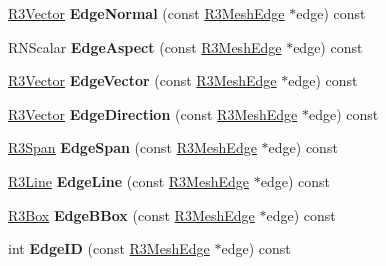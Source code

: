 \begin{DoxyCompactItemize}
\item 
\hyperlink{class_r3_vector}{R3\+Vector} {\bfseries Edge\+Normal} (const \hyperlink{class_r3_mesh_edge}{R3\+Mesh\+Edge} $\ast$edge) const \hypertarget{class_r3_mesh_a323d930cd1a63adc8bb01298bd57156e}{}\label{class_r3_mesh_a323d930cd1a63adc8bb01298bd57156e}

\item 
R\+N\+Scalar {\bfseries Edge\+Aspect} (const \hyperlink{class_r3_mesh_edge}{R3\+Mesh\+Edge} $\ast$edge) const \hypertarget{class_r3_mesh_a1547259cce0801d7263b302afcdbd0c5}{}\label{class_r3_mesh_a1547259cce0801d7263b302afcdbd0c5}

\item 
\hyperlink{class_r3_vector}{R3\+Vector} {\bfseries Edge\+Vector} (const \hyperlink{class_r3_mesh_edge}{R3\+Mesh\+Edge} $\ast$edge) const \hypertarget{class_r3_mesh_aad036b1fa918e9bf15c2b41d4c711fe7}{}\label{class_r3_mesh_aad036b1fa918e9bf15c2b41d4c711fe7}

\item 
\hyperlink{class_r3_vector}{R3\+Vector} {\bfseries Edge\+Direction} (const \hyperlink{class_r3_mesh_edge}{R3\+Mesh\+Edge} $\ast$edge) const \hypertarget{class_r3_mesh_aaf21c558310ae4318c72d11dc804121a}{}\label{class_r3_mesh_aaf21c558310ae4318c72d11dc804121a}

\item 
\hyperlink{class_r3_span}{R3\+Span} {\bfseries Edge\+Span} (const \hyperlink{class_r3_mesh_edge}{R3\+Mesh\+Edge} $\ast$edge) const \hypertarget{class_r3_mesh_a703a5fa6e945569f85229c394c57c2f5}{}\label{class_r3_mesh_a703a5fa6e945569f85229c394c57c2f5}

\item 
\hyperlink{class_r3_line}{R3\+Line} {\bfseries Edge\+Line} (const \hyperlink{class_r3_mesh_edge}{R3\+Mesh\+Edge} $\ast$edge) const \hypertarget{class_r3_mesh_a9fc0eab27120e7a6c67fd07f9b27cc14}{}\label{class_r3_mesh_a9fc0eab27120e7a6c67fd07f9b27cc14}

\item 
\hyperlink{class_r3_box}{R3\+Box} {\bfseries Edge\+B\+Box} (const \hyperlink{class_r3_mesh_edge}{R3\+Mesh\+Edge} $\ast$edge) const \hypertarget{class_r3_mesh_a58ef7b563e56b675630d5f721aadcb19}{}\label{class_r3_mesh_a58ef7b563e56b675630d5f721aadcb19}

\item 
int {\bfseries Edge\+ID} (const \hyperlink{class_r3_mesh_edge}{R3\+Mesh\+Edge} $\ast$edge) const \hypertarget{class_r3_mesh_a5ce0c3d7e69041d111ffcdaf8fa46286}{}\label{class_r3_mesh_a5ce0c3d7e69041d111ffcdaf8fa46286}


\end{DoxyCompactItemize}
